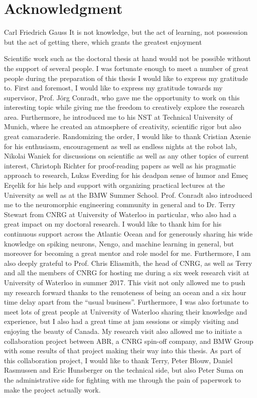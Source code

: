 \chapter*{Acknowledgment}
\begin{chapquote}{Carl Friedrich Gauss}
It is not knowledge, but the act of learning, not possession but the act of getting there, which grants the greatest enjoyment
\end{chapquote}

Scientific work such as the doctoral thesis at hand would not be possible without the support of several people.
I was fortunate enough to meet a number of great people during the preparation of this thesis I would like to express my gratitude to.
First and foremost, I would like to express my gratitude towards  my supervisor, Prof. J\"org Conradt, who gave me the opportunity to work on this interesting topic while giving me the freedom to creatively explore the research area.
Furthermore, he introduced me to his \acl{NST} at Technical University of Munich, where he created an atmosphere of creativity, scientific rigor but also great camaraderie.
Randomizing the order, I would like to thank Cristian Axenie for his enthusiasm, encouragement as well as endless nights at the robot lab, Nikolai Waniek for discussions on scientific as well as any other topics of current interest, Christoph Richter for proof-reading papers as well as his pragmatic approach to research, Lukas Everding for his deadpan sense of humor and Eme\c{c} Er\c{c}elik for his help and support with organizing practical lectures at the University as well as at the BMW Summer School.
Prof. Conradt also introduced me to the neuromorphic engineering community in general and to Dr. Terry Stewart from \ac{CNRG} at University of Waterloo in particular, who also had a great impact on my doctoral research.
I would like to thank him for his continuous support across the Atlantic Ocean and for generously sharing his wide knowledge on spiking neurons, Nengo, and machine learning in general, but moreover for becoming a great mentor and role model for me.
Furthermore, I am also deeply grateful to Prof. Chris Eliasmith, the head of \ac{CNRG}, as well as Terry and all the members of \ac{CNRG} for hosting me during a six week research visit at University of Waterloo in summer 2017.
This visit not only allowed me to push my research forward thanks to the remoteness of being an ocean and a six hour time delay apart from the \enquote{usual business}.
Furthermore, I was also fortunate to meet lots of great people at University of Waterloo sharing their knowledge and experience, but I also had a great time at jam sessions or simply visiting and enjoying the beauty of Canada.
My research visit also allowed me to initiate a collaboration project between \ac{ABR}, a \ac{CNRG} spin-off company, and BMW Group with some results of that project making their way into this thesis.
As part of this collaboration project, I would like to thank Terry, Peter Blouw, Daniel Rasmussen and Eric Hunsberger on the technical side, but also Peter Suma on the administrative side for fighting with me through the pain of paperwork to make the project actually work.


